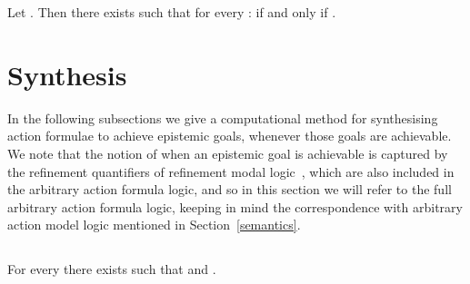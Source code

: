 \documentclass[twoside]{aiml14}
\begin{document}
  \begin{corollary}
      Let . 
      Then there exists  
      such that for every : 
       if and only if
      .
  \end{corollary}

  \section{Synthesis}\label{synthesis}

  In the following subsections we give a computational method for synthesising
  action formulae to achieve epistemic goals, whenever those goals are
  achievable.  We note that the notion of when an epistemic goal is achievable
  is captured by the refinement quantifiers of refinement modal
  logic~\cite{vanditmarsch2009,bozzelli2012a}, which are also included in the
  arbitrary action formula logic, and so in this section we will refer to the full
  arbitrary action formula logic, keeping in mind the correspondence with 
  arbitrary action model logic mentioned in Section~\ref{semantics}.

  \subsection{\classK{}}

  \begin{proposition}\label{afl-k-synthesis}
      For every  there exists  such that  and .
  \end{proposition}
\end{document}
